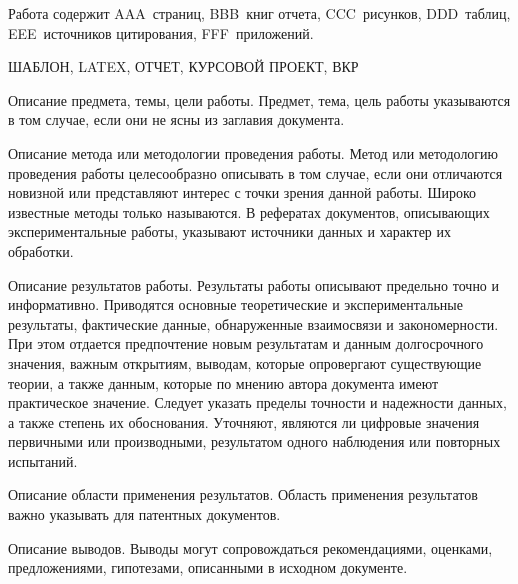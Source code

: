 \annotate


Работа содержит AAA~страниц, BBB~книг отчета, CCC~рисунков, DDD~таблиц,
EEE~источников цитирования, FFF~приложений.



ШАБЛОН, LATEX, ОТЧЕТ, КУРСОВОЙ ПРОЕКТ, ВКР



Описание предмета, темы, цели работы. Предмет, тема, цель работы указываются в
том случае, если они не ясны из заглавия документа.

Описание метода или методологии проведения работы. Метод или методологию
проведения работы целесообразно описывать в том случае, если они отличаются
новизной или представляют интерес с точки зрения данной работы. Широко
известные методы только называются. В рефератах документов, описывающих
экспериментальные работы, указывают источники данных и характер их обработки.

Описание результатов работы. Результаты работы описывают предельно точно и
информативно. Приводятся основные теоретические и экспериментальные результаты,
фактические данные, обнаруженные взаимосвязи и закономерности. При этом
отдается предпочтение новым результатам и данным долгосрочного значения, важным
открытиям, выводам, которые опровергают существующие теории, а также данным,
которые по мнению автора документа имеют практическое значение. Следует указать
пределы точности и надежности данных, а также степень их обоснования. Уточняют,
являются ли цифровые значения первичными или производными, результатом одного
наблюдения или повторных испытаний.

Описание области применения результатов. Область применения результатов важно
указывать для патентных документов.

Описание выводов. Выводы могут сопровождаться рекомендациями, оценками,
предложениями, гипотезами, описанными в исходном документе.

